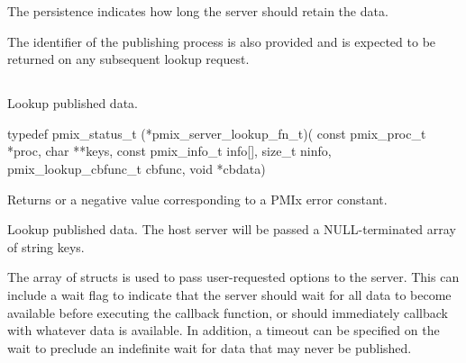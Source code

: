 The persistence indicates how long the server should retain the data.

The identifier of the publishing process is also provided and is expected to be returned on any subsequent lookup request.


\subsection{}

\summary

Lookup published data.

\format

\cspecificstart
\begin{codepar}
typedef pmix_status_t (*pmix_server_lookup_fn_t)(
                             const pmix_proc_t *proc, char **keys,
                             const pmix_info_t info[], size_t ninfo,
                             pmix_lookup_cbfunc_t cbfunc, void *cbdata)
\end{codepar}
\cspecificend

\begin{arglist}
\end{arglist}

Returns  or a negative value corresponding to a PMIx error constant.

\descr

Lookup published data.
The host server will be passed a NULL-terminated array of string keys.

The array of  structs is used to pass user-requested options to the server.
This can include a wait flag to indicate that the server should wait for all data to become available before executing the callback function, or should immediately callback with whatever data is available.
In addition, a timeout can be specified on the wait to preclude an indefinite wait for data that may never be published.


\subsection{}

